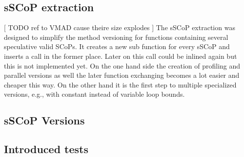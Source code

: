 \subsection{sSCoP extraction}

[ TODO ref to VMAD cause theire size explodes ]
The sSCoP extraction was designed to simplify the method versioning for functions
containing several speculative valid SCoPs. It creates a new sub function for every
sSCoP and inserts a call in the former place. Later on this call could be inlined again
but this is not implemented yet. On the one hand side the creation of profiling and
parallel versions as well the later function exchanging becomes a lot easier and cheaper
this way. On the other hand it is the first step to multiple specialized versions, e.g., with
constant instead of variable loop bounds.



\subsection{sSCoP Versions}


\subsection{Introduced tests}







